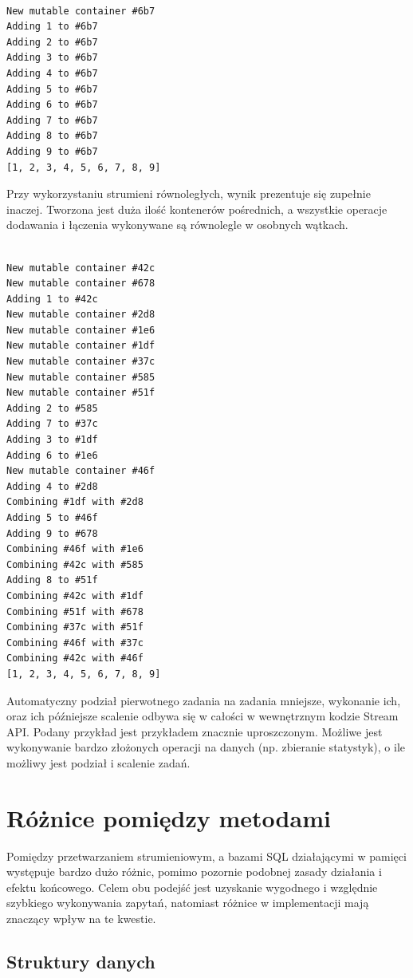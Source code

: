 \documentclass[12pt]{extarticle}
\begin{document}
\begin{verbatim}

New mutable container #6b7
Adding 1 to #6b7
Adding 2 to #6b7
Adding 3 to #6b7
Adding 4 to #6b7
Adding 5 to #6b7
Adding 6 to #6b7
Adding 7 to #6b7
Adding 8 to #6b7
Adding 9 to #6b7
[1, 2, 3, 4, 5, 6, 7, 8, 9]

\end{verbatim}

Przy wykorzystaniu strumieni równoległych, wynik prezentuje się zupełnie inaczej. Tworzona jest duża ilość kontenerów pośrednich, a wszystkie operacje dodawania i łączenia wykonywane są równolegle w osobnych wątkach.

\begin{verbatim}

New mutable container #42c
New mutable container #678
Adding 1 to #42c
New mutable container #2d8
New mutable container #1e6
New mutable container #1df
New mutable container #37c
New mutable container #585
New mutable container #51f
Adding 2 to #585
Adding 7 to #37c
Adding 3 to #1df
Adding 6 to #1e6
New mutable container #46f
Adding 4 to #2d8
Combining #1df with #2d8
Adding 5 to #46f
Adding 9 to #678
Combining #46f with #1e6
Combining #42c with #585
Adding 8 to #51f
Combining #42c with #1df
Combining #51f with #678
Combining #37c with #51f
Combining #46f with #37c
Combining #42c with #46f
[1, 2, 3, 4, 5, 6, 7, 8, 9]

\end{verbatim}

    Automatyczny podział pierwotnego zadania na zadania mniejsze, wykonanie ich, oraz ich późniejsze scalenie odbywa się w całości w wewnętrznym kodzie Stream API. Podany przykład jest przykładem znacznie uproszczonym. Możliwe jest wykonywanie bardzo złożonych operacji na danych (np. zbieranie statystyk), o ile możliwy jest podział i scalenie zadań.

\section{Różnice pomiędzy metodami}

    Pomiędzy przetwarzaniem strumieniowym, a bazami SQL działającymi w pamięci występuje bardzo dużo różnic, pomimo pozornie podobnej zasady działania i efektu końcowego. Celem obu podejść jest uzyskanie wygodnego i względnie szybkiego wykonywania zapytań, natomiast różnice w implementacji mają znaczący wpływ na te kwestie.

\subsection{Struktury danych}
\end{document}
